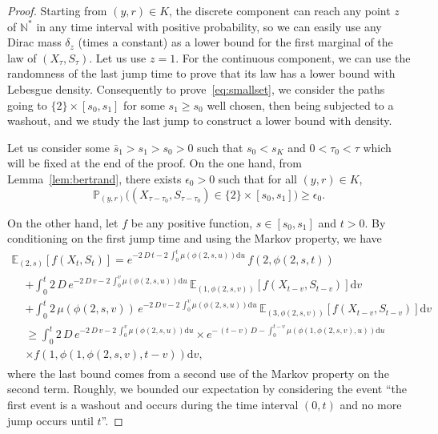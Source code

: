 \documentclass[10pt]{amsart}
\theoremstyle{definition}\newtheorem{defi}[theo]{Definition}\newtheorem{rema}[theo]{Remark}\newtheorem{exam}[theo]{Example}\newtheorem{exem}[theo]{Example}\newtheorem{nota}[theo]{Notation}
\newcommand{\PP}{\mathbb{P}}
\newcommand{\NN}{\mathbb{N}}
\newcommand{\EE}{\mathbb{E}}
\newcommand{\dif}{\mathrm{d}}
\newcommand{\1}{\mathbf{1}}
\begin{document}
\begin{proof}
Starting from $(y,r) \in K$, the discrete component can reach any point $z$ of $\NN^*$ in any time interval with positive probability, so we can easily use any Dirac mass $\delta_z$ (times a constant) as a lower bound for the first marginal of the law of $(X_\tau, S_\tau)$. Let us use $z=1$. For the continuous component, we can use the randomness of the last jump time to prove that its law has a lower bound with Lebesgue density. Consequently to prove~\eqref{eq:smallset}, we consider the paths going to $\{2\} \times [s_0,s_1]$ for some $s_1\geq s_0$ well chosen, then being subjected to a washout, and we study the last jump to construct a lower bound with density.

Let us consider some $\bar s_1> s_1>s_0>0$ such that $s_0<s_K$ and $0<\tau_0<\tau$ which will be fixed at the end of the proof. On the one hand, from Lemma~\ref{lem:bertrand}, there exists $\epsilon_0>0$ such that for all $(y,r)\in K$,
\begin{equation}\label{eq:smallsetpresque0}
\PP_{(y,r)}\big((X_{\tau-\tau_0},S_{\tau-\tau_0})\in \{2\}\times [s_0,s_1]\big) \geq \epsilon_0.
\end{equation}

On the other hand, let $f$ be any positive function, $s \in [s_0,s_1]$ and $t>0$. By conditioning on the first jump time and using the Markov property, we have
\begin{multline*}
\EE_{(2,s)}\left[f(X_t,S_t)\right]
= e^{-2\,D\, t - 2\,\int_0^t \mu (\phi(2,s,u)) \dif u} \,f\left(2, \phi(2,s,t)\right)\\
\begin{aligned}
&+ \int_0^t 2\,D \,e^{-2\,D\, v - 2\,\int_0^v \mu (\phi(2,s,u)) \dif u} \,\EE_{(1,\phi(2,s,v))}\left[f(X_{t-v},S_{t-v})\right] \dif v\\
&+ \int_0^t 2\,\mu (\phi(2,s,v)) \, e^{-2\,D\,v - 2\,\int_0^v \mu (\phi(2,s,u)) \dif u} \,
\EE_{(3,\phi(2,s,v))}\left[f(X_{t-v},S_{t-v})\right] \dif v\\
&\geq \int_0^t 2\,D \, e^{-2\,D \, v - 2\,\int_0^v \mu (\phi(2,s,u)) \dif u} \times e^{-\, (t-v)\,D - \int_0^{t-v} \mu (\phi(1,\phi(2,s,v),u)) \dif u} \\
&\times f\left(1, \phi(1,\phi(2,s,v),t-v)\right) \dif v,
\end{aligned}
\end{multline*}
where the last bound comes from a second use of the Markov property on the second term. Roughly, we bounded our expectation by considering the event ``the first event is a washout and occurs during the time interval $(0,t)$ and no more jump occurs until $t$''.



\end{proof}
\end{document}
